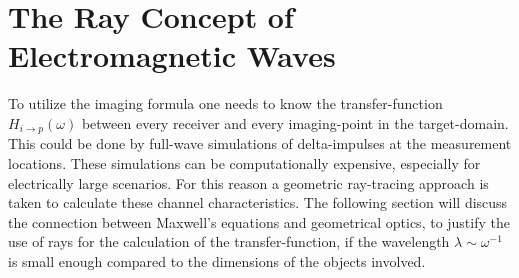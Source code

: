 \section{The Ray Concept of Electromagnetic Waves}\label{sec:ray-concept}
To utilize the imaging formula one needs to know the transfer-function \(H_{i\rightarrow p}(\omega)\) between every receiver and every imaging-point in the target-domain.
This could be done by full-wave simulations of delta-impulses at the measurement locations.
These simulations can be computationally expensive, especially for electrically large scenarios.
For this reason a geometric ray-tracing approach is taken to calculate these channel characteristics.
The following section will discuss the connection between Maxwell's equations and geometrical optics, to justify the use of rays for the calculation of the transfer-function, if the wavelength \(\lambda \sim \omega^{-1} \) is small enough compared to the dimensions of the objects involved.

